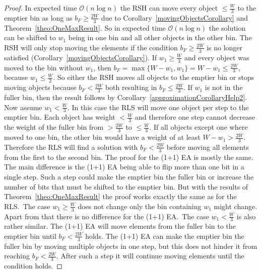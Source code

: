 \begin{proof}
    In expected time $\mathcal{O}(n\log{}n)$ the RSH can move every object $\le \frac{W}{3}$ to the emptier bin as long as $b_F \ge \frac{2W}{3}$ due to Corollary~\ref{movingObjectsCorollary} and Theorem~\ref{theo:OneMaxResult}.
    So in expected time $\mathcal{O}(n\log{}n)$ the solution can be shifted to $w_1$ being in one bin and all other objects in the other bin.
    The RSH will only stop moving the elements if the condition $b_F \ge \frac{2W}{3}$ is no longer satisfied (Corollary~\ref{movingObjectsCorollary}).
    If \(w_1 \ge \frac{W}{3}\) and every object was moved to the bin without $w_1$, then \(b_F = \max\{W-w_1, w_1\} = W-w_1 \le \frac{2W}{3}\), because \(w_1 \le \frac{W}{2}\).
    So either the RSH moves all objects to the emptier bin or stops moving objects because $b_F < \frac{2W}{3}$ both resulting in $b_F \le \frac{2W}{3}$.
    If $w_1$ is not in the fuller bin, then the result follows by Corollary~\ref{approximationCorollaryHelp2}.\newline
    Now assume \(w_1 < \frac{W}{3}\).
    In this case the RLS will move one object per step to the emptier bin.
    Each object has weight $< \frac{W}{3}$ and therefore one step cannot decrease the weight of the fuller bin from $> \frac{2W}{3}$ to $\le \frac{W}{3}$.
    If all objects except one where moved to one bin, the other bin would have a weight of at least \(W-w_1 > \frac{2W}{3}\).
    Therefore the RLS will find a solution with $b_F < \frac{2W}{3}$ before moving all elements from the first to the second bin.\newline
    The proof for the (1+1) EA is mostly the same.
    The main difference is the (1+1) EA being able to flip more than one bit in a single step.
    Such a step could make the emptier bin the fuller bin or increase the number of bits that must be shifted to the emptier bin.
    But with the results of Theorem~\ref{theo:OneMaxResult} the proof works exactly the same as for the RLS.\
    The case \(w_1 \ge \frac{W}{3}\) does not change only the bin containing $w_1$ might change.
    Apart from that there is no difference for the (1+1) EA.\
    The case $w_1 < \frac{W}{3}$ is also rather similar.
    The (1+1) EA will move elements from the fuller bin to the emptier bin until $b_F < \frac{2W}{3}$ holds. The (1+1) EA can make the emptier bin the fuller bin by moving multiple objects in one step, but this does not hinder it from reaching $b_F < \frac{2W}{3}$. After such a step it will continue moving elements until the condition holds.
\end{proof}

